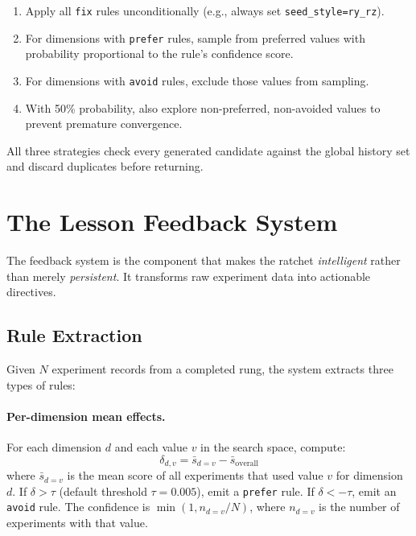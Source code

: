\documentclass[11pt,a4paper]{article}
\newcommand{\code}[1]{\texttt{#1}}
\begin{document}
\begin{enumerate}
  \item Apply all \code{fix} rules unconditionally (e.g., always set
    \code{seed\_style=ry\_rz}).
  \item For dimensions with \code{prefer} rules, sample from preferred values
    with probability proportional to the rule's confidence score.
  \item For dimensions with \code{avoid} rules, exclude those values from
    sampling.
  \item With 50\% probability, also explore non-preferred, non-avoided values
    to prevent premature convergence.
\end{enumerate}

All three strategies check every generated candidate against the global
history set and discard duplicates before returning.

\section{The Lesson Feedback System}
\label{sec:lessons}

The feedback system is the component that makes the ratchet
\emph{intelligent} rather than merely \emph{persistent}. It transforms raw
experiment data into actionable directives.

\subsection{Rule Extraction}
\label{sec:rules}

Given $N$ experiment records from a completed rung, the system extracts three
types of rules:

\paragraph{Per-dimension mean effects.} For each dimension $d$ and each value
$v$ in the search space, compute:
\begin{equation}
  \delta_{d,v} = \bar{s}_{d=v} - \bar{s}_{\text{overall}}
  \label{eq:delta}
\end{equation}
where $\bar{s}_{d=v}$ is the mean score of all experiments that used value
$v$ for dimension $d$. If $\delta > \tau$ (default threshold $\tau = 0.005$),
emit a \code{prefer} rule. If $\delta < -\tau$, emit an \code{avoid} rule.
The confidence is $\min(1, n_{d=v} / N)$, where $n_{d=v}$ is the number of
experiments with that value.
\end{document}
